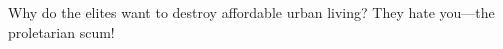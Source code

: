 \startchapter[title={The Green Movement and Agenda 21}]
\startsection[title={Misathropy and the Green Movement}]
Why do the elites want to destroy affordable urban living?
They hate you---the proletarian scum!
\stopsection
\stopchapter

